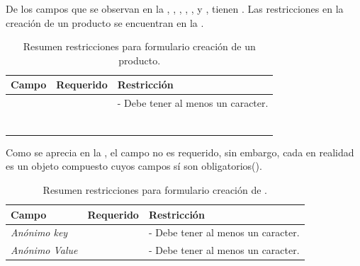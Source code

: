 		De los campos que se observan en la , \titleForm, \pageTitleForm, \vendorForm, \descriptionForm, \tagsForm y \detailsForm, tienen \feedbackReactivoDEF. Las restricciones en la creación de un producto se encuentran en la . 

		\begin{table}[H]
		    \centering
			\begin{tabular}{ |l|c||l| }
				\hline Campo & Requerido & Restricción \\ \hline
				\multirow{1}{*}{\titleForm} 			&  \multirow{1}{*}{\checkmark} & - Debe tener al menos un caracter. \\ \hline
				\multirow{1}{*}{\pageTitleForm} 	&  \multirow{1}{*}{} &  \\ \hline
				\multirow{1}{*}{\vendorForm}		&  \multirow{1}{*}{} &  \\ \hline
				\multirow{1}{*}{\optionsForm}		&  \multirow{1}{*}{\checkmark} &  \\ \hline
				\multirow{1}{*}{\descriptionForm}	&  \multirow{1}{*}{} &  \\ \hline
				\multirow{1}{*}{\multimediaForm}	&  \multirow{1}{*}{} &  \\ \hline
				\multirow{1}{*}{\tagsForm}			&  \multirow{1}{*}{} &  \\ \hline
			\end{tabular}
		 	\caption{Resumen restricciones para formulario creación de un producto.}
		    \label{tab:solution:products:create:form:product:generic}
		\end{table}

		Como se aprecia en la , el campo \detailsForm no es requerido, sin embargo, cada \detailForm en realidad es un objeto compuesto cuyos campos sí son obligatorios().

		\begin{table}[H]
		    \centering
			\begin{tabular}{ |l|c||l| }
				\hline Campo & Requerido & Restricción \\ \hline
				\multirow{1}{*}{\textit{Anónimo key}}	&  \multirow{1}{*}{\checkmark} & - Debe tener al menos un caracter. \\ \hline
				\multirow{1}{*}{\textit{Anónimo Value}}	&  \multirow{1}{*}{\checkmark} & - Debe tener al menos un caracter. \\ \hline
			\end{tabular}
		 	\caption{Resumen restricciones para formulario creación de \detailsForm.}
		    \label{tab:solution:products:create:form:product:generic:details}
		\end{table}

